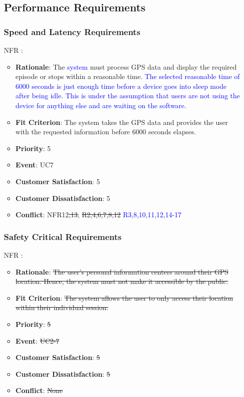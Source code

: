 \documentclass[12pt, titlepage]{article}
\newcounter{reqnum} %
\newcounter{freqnum} %
\begin{document}
\begin{itemize}
\subsection{Performance Requirements}

\subsubsection{Speed and Latency Requirements}
\item[NFR\refstepcounter{freqnum}\thefreqnum
\label{NFR}:] 
\begin{itemize}
    \item \textbf{Rationale}: The \textcolor{blue}{system} must process GPS data and display the required episode or stops within a reasonable time. \textcolor{blue}{The selected reasonable time of 6000 seconds is just enough time before a device goes into sleep mode after being idle. This is under the assumption that users are not using the device for anything else and are waiting on the software. }
    \item \textbf{Fit Criterion}: The system takes the GPS data and provides the user with the requested information before 6000 seconds elapses.
    \item \textbf{Priority}: 5
    \item \textbf{Event}: UC7 %
    \item \textbf{Customer Satisfaction}: 5
    \item \textbf{Customer Dissatisfaction}: 5
    \item \textbf{Conflict}: NFR12\sout{,13}; \sout{R2,4,6,7,8,12} \textcolor{blue}{R3,8,10,11,12,14-17}
\end{itemize}
\subsubsection{Safety Critical Requirements}
\item[NFR\refstepcounter{freqnum}\thefreqnum
\label{NFR}:] 
\begin{itemize}
    \item \textbf{Rationale}: \sout{The user's personal information centers around their GPS location. Hence, the system must not make it accessible by the public.}
    \item \textbf{Fit Criterion}: \sout{The system allows the user to only access their location within their individual session.}
    \item \textbf{Priority}: \sout{5}
    \item \textbf{Event}: \sout{UC2-7}%
    \item \textbf{Customer Satisfaction}: \sout{5}
    \item \textbf{Customer Dissatisfaction}: \sout{5}
    \item \textbf{Conflict}: \sout{None}
\end{itemize}

\end{itemize}
\end{document}
